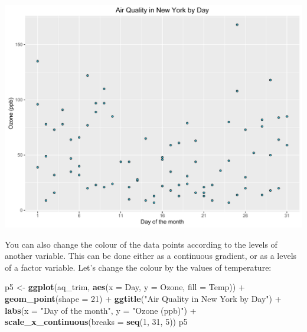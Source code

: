 \documentclass[]{article}
\newenvironment{Shaded}{\begin{snugshade}}{\end{snugshade}}
\newcommand{\KeywordTok}[1]{\textcolor[rgb]{0.13,0.29,0.53}{\textbf{{#1}}}}
\newcommand{\DataTypeTok}[1]{\textcolor[rgb]{0.13,0.29,0.53}{{#1}}}
\newcommand{\DecValTok}[1]{\textcolor[rgb]{0.00,0.00,0.81}{{#1}}}
\newcommand{\StringTok}[1]{\textcolor[rgb]{0.31,0.60,0.02}{{#1}}}
\newcommand{\NormalTok}[1]{{#1}}
\begin{document}
\begin{center}\includegraphics{0_all_posts_pdf/scatter_6-1} \end{center}

You can also change the colour of the data points according to the
levels of another variable. This can be done either as a continuous
gradient, or as a levels of a factor variable. Let's change the colour
by the values of temperature:

\begin{Shaded}
\begin{Highlighting}[]
\NormalTok{p5 <-}\StringTok{ }\KeywordTok{ggplot}\NormalTok{(aq_trim, }\KeywordTok{aes}\NormalTok{(}\DataTypeTok{x =} \NormalTok{Day, }\DataTypeTok{y =} \NormalTok{Ozone, }\DataTypeTok{fill =} \NormalTok{Temp)) +}\StringTok{ }
\StringTok{      }\KeywordTok{geom_point}\NormalTok{(}\DataTypeTok{shape =} \DecValTok{21}\NormalTok{) +}
\StringTok{      }\KeywordTok{ggtitle}\NormalTok{(}\StringTok{"Air Quality in New York by Day"}\NormalTok{) +}\StringTok{ }
\StringTok{      }\KeywordTok{labs}\NormalTok{(}\DataTypeTok{x =} \StringTok{"Day of the month"}\NormalTok{, }\DataTypeTok{y =} \StringTok{"Ozone (ppb)"}\NormalTok{) +}
\StringTok{      }\KeywordTok{scale_x_continuous}\NormalTok{(}\DataTypeTok{breaks =} \KeywordTok{seq}\NormalTok{(}\DecValTok{1}\NormalTok{, }\DecValTok{31}\NormalTok{, }\DecValTok{5}\NormalTok{))}
\NormalTok{p5}
\end{Highlighting}
\end{Shaded}
\end{document}
